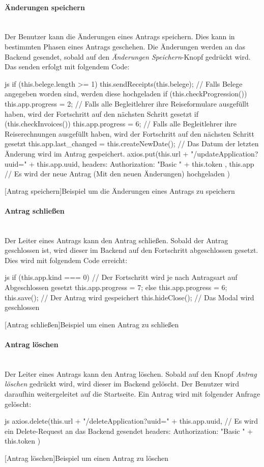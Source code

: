 \paragraph{Änderungen speichern}~\\
Der Benutzer kann die Änderungen eines Antrags speichern. Dies kann in bestimmten Phasen eines Antrags geschehen. Die Änderungen werden an das Backend gesendet, sobald auf den \textit{Änderungen Speichern}-Knopf gedrückt wird. Das senden erfolgt mit folgendem Code:
\begin{code}{js}
	if (this.belege.length >= 1) {
		this.sendReceipts(this.belege); // Falls Belege angegeben worden sind, werden diese hochgeladen
	}
	if (this.checkProgression()) {
		this.app.progress = 2;	// Falls alle Begleitlehrer ihre Reiseformulare ausgefüllt haben, wird der Fortschritt auf den nächsten Schritt gesetzt
	}
	if (this.checkInvoices()) {
		this.app.progress = 6; // Falls alle Begleitlehrer ihre Reiserechnungen ausgefüllt haben, wird der Fortschritt auf den nächsten Schritt gesetzt
	}
	this.app.last_changed = this.createNewDate(); // Das Datum der letzten Änderung wird im Antrag gespeichert.
	axios.put(this.url + "/updateApplication?uuid=" + this.app.uuid,
	{
		headers: {
			Authorization: "Basic " + this.token
		}
	},
	this.app // Es wird der neue Antrag (Mit den neuen Änderungen) hochgeladen
	)
\end{code}
[Antrag speichern]{Beispiel um die Änderungen eines Antrags zu speichern}~\\
\paragraph{Antrag schließen}~\\
Der Leiter eines Antrags kann den Antrag schließen. Sobald der Antrag geschlossen ist, wird dieser im Backend auf den Fortschritt abgeschlossen gesetzt. Dies wird mit folgendem Code erreicht:
\begin{code}{js}
	if (this.app.kind === 0) {	// Der Fortschritt wird je nach Antragsart auf Abgeschlossen gesetzt
		this.app.progress = 7;
	} else {
		this.app.progress = 6;
	}
	this.save(); // Der Antrag wird gespeichert
	this.hideClose(); // Das Modal wird geschlossen
\end{code}
[Antrag schließen]{Beispiel um einen Antrag zu schließen}~\\
\newpage
\paragraph{Antrag löschen}~\\
Der Leiter eines Antrags kann den Antrag löschen. Sobald auf den Knopf \textit{Antrag löschen} gedrückt wird, wird dieser im Backend gelöscht. Der Benutzer wird daraufhin weitergeleitet auf die Startseite. Ein Antrag wird mit folgender Anfrage gelöscht:
\begin{code}{js}
	axios.delete(this.url + "/deleteApplication?uuid=" + this.app.uuid, { // Es wird ein Delete-Request an das Backend gesendet
		headers: {
			Authorization: "Basic " + this.token
		}
	})
\end{code}
[Antrag löschen]{Beispiel um einen Antrag zu löschen}~\\
\newpage
